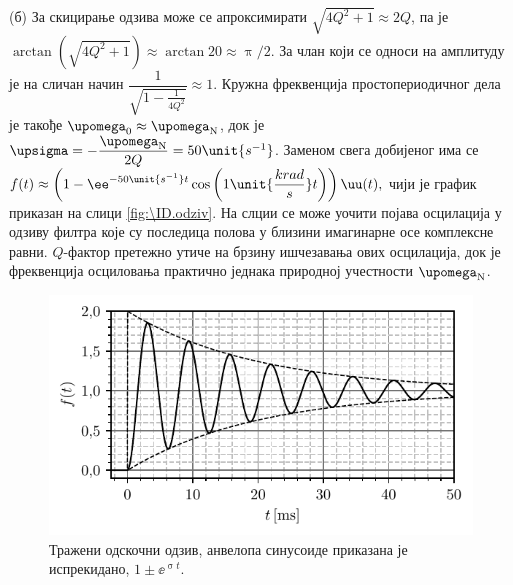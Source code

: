 (б) За скицирање одзива може се апроксимирати $\sqrt{4Q^2 + 1} \approx 2Q$, па је 
$\arctan(\sqrt{4Q^2 + 1}) \approx \arctan 20 \approx \uppi/2$. За члан који се односи на амплитуду је на сличан начин 
$
\dfrac{1}{\sqrt{1 - \frac{1}{4Q^2}} } \approx 1
$. Кружна фреквенција простопериодичног дела је такође $\upomega_{\rm 0} \approx \upomega_{\rm N}$, док је 
$\upsigma = -\dfrac{\upomega_{\rm N}}{2Q} = 50\unit{s^{-1}}$. Заменом свега добијеног има се 
$
    f(t) \approx \left(
        1 - \ee^{- 50\unit{s^{-1}} t } \cos \left( 1\unit{\dfrac{krad}{s}} t \right)
    \right) \uu(t),
$ чији је график приказан на слици \ref{fig:\ID.odziv}. На слции се може уочити појава осцилација у одзиву филтра које су  
последица полова у близини имагинарне осе комплексне равни. $Q$-фактор претежно утиче на брзину ишчезавања ових осцилација, 
док је фреквенција осциловања практично једнака природној учестности $\upomega_{\rm N}$. 
\begin{figure}[ht!]
    \centering
    \includegraphics{fig/Q_odziv.pdf}
    \caption{Тражени одскочни одзив, анвелопа синусоиде приказана је испрекидано, 
    $1 \pm \ee^{\upsigma t}$.}
\end{figure}

